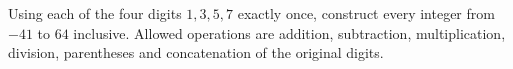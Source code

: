 Using each of the four digits $1,3,5,7$ exactly once, construct every integer from $-41$ to $64$ inclusive. Allowed operations are addition, subtraction, multiplication, division, parentheses and concatenation of the original digits.
